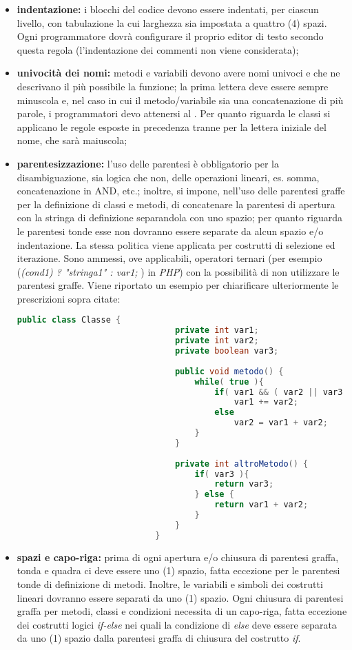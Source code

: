 					\begin{itemize}
						\item \textbf{indentazione:} i blocchi del codice devono essere indentati, per ciascun livello, con tabulazione la cui larghezza sia impostata a quattro (4) spazi. Ogni programmatore dovrà configurare il proprio editor di testo secondo questa regola (l'indentazione dei commenti non viene considerata);
						\item \textbf{univocità dei nomi:} metodi e variabili devono avere nomi univoci e che ne descrivano il più possibile la funzione; la prima lettera deve essere sempre minuscola e, nel caso in cui il metodo/variabile sia una concatenazione di più parole, i programmatori devo attenersi al .
						Per quanto riguarda le classi si applicano le regole esposte in precedenza tranne per la lettera iniziale del nome, che sarà maiuscola;
						\item \textbf{parentesizzazione:} l'uso delle parentesi è obbligatorio per la disambiguazione, sia logica che non, delle operazioni lineari, es. somma, concatenazione in AND, etc.; inoltre, si impone, nell'uso delle parentesi graffe per la definizione di classi e metodi, di concatenare la parentesi di apertura con la stringa di definizione separandola con uno spazio; per quanto riguarda le parentesi tonde esse non dovranno essere separate da alcun spazio e/o indentazione. La stessa politica viene applicata per costrutti di selezione ed iterazione. Sono ammessi, ove applicabili, operatori ternari (per esempio (\textit{(cond1) ? "stringa1" : var1; }) in \textit{PHP}) con la possibilità di non utilizzare le parentesi graffe. Viene riportato un esempio per chiarificare ulteriormente le prescrizioni sopra citate:
						
						\begin{lstlisting}[language=java,captionpos=b,caption={Esempio di dichiarazione di una classe in Java}]
							public class Classe {
								private int var1;
								private int var2;
								private boolean var3;
								
								public void metodo() {
									while( true ){
								   		if( var1 && ( var2 || var3 ))
									  		var1 += var2;
										else
							   				var2 = var1 + var2;
									}
								}
								
								private int altroMetodo() {
									if( var3 ){
										return var3;
									} else {
										return var1 + var2;
									}
								}
							}
						\end{lstlisting}

						\item \textbf{spazi e capo-riga:} prima di ogni apertura e/o chiusura di parentesi graffa, tonda e quadra ci deve essere uno (1) spazio, fatta eccezione per le parentesi tonde di definizione di metodi. Inoltre, le variabili e simboli dei costrutti lineari dovranno essere separati da uno (1) spazio. Ogni chiusura di parentesi graffa per metodi, classi e condizioni necessita di un capo-riga, fatta eccezione dei costrutti logici \textit{if-else} nei quali la condizione di \textit{else} deve essere separata da uno (1) spazio dalla parentesi graffa di chiusura del costrutto \textit{if}.
					\end{itemize}


